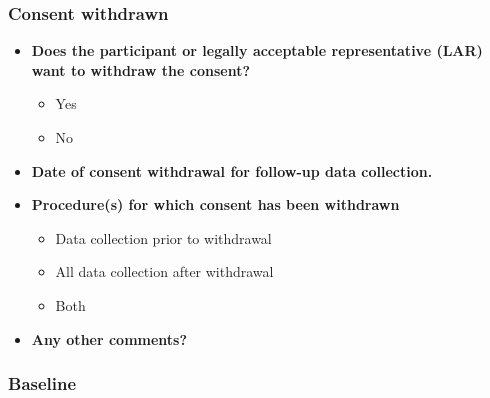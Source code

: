\documentclass[
]{scrartcl}
\providecommand{\tightlist}{%
  \setlength{\itemsep}{0pt}\setlength{\parskip}{0pt}}\usepackage{longtable,booktabs,array}
\begin{document}
\subsubsection{Consent withdrawn}\label{consent-withdrawn}

\begin{itemize}
\item
  \textbf{Does the participant or legally acceptable representative
  (LAR) want to withdraw the consent?}

  \begin{itemize}
  \tightlist
  \item
    Yes
  \item
    No
  \end{itemize}
\item
  \textbf{Date of consent withdrawal for follow-up data collection.}
\item
  \textbf{Procedure(s) for which consent has been withdrawn}

  \begin{itemize}
  \tightlist
  \item
    Data collection prior to withdrawal
  \item
    All data collection after withdrawal
  \item
    Both
  \end{itemize}
\item
  \textbf{Any other comments?}
\end{itemize}

\subsubsection{Baseline}\label{baseline}
\end{document}
